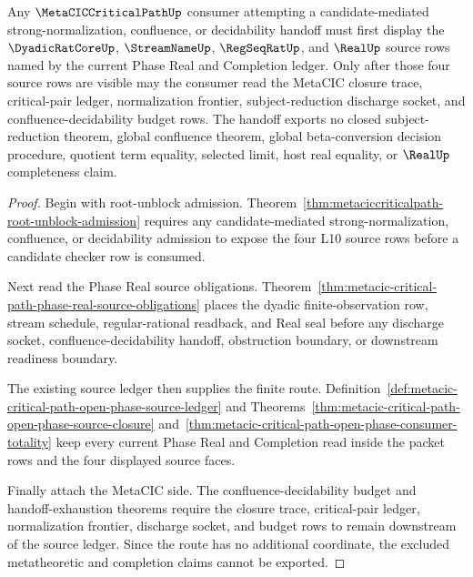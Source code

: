 \begin{theorem}
\label{thm:metacic-critical-path-confluence-decidability-source-budget}
Any $\MetaCICCriticalPathUp$ consumer attempting a candidate-mediated strong-normalization, confluence, or decidability handoff must first display the $\DyadicRatCoreUp$, $\StreamNameUp$, $\RegSeqRatUp$, and $\RealUp$ source rows named by the current Phase Real and Completion ledger. Only after those four source rows are visible may the consumer read the MetaCIC closure trace, critical-pair ledger, normalization frontier, subject-reduction discharge socket, and confluence-decidability budget rows. The handoff exports no closed subject-reduction theorem, global confluence theorem, global beta-conversion decision procedure, quotient term equality, selected limit, host real equality, or $\RealUp$ completeness claim.
\end{theorem}
\begin{proof}
Begin with root-unblock admission. Theorem~\ref{thm:metaciccriticalpath-root-unblock-admission} requires any candidate-mediated strong-normalization, confluence, or decidability admission to expose the four L10 source rows before a candidate checker row is consumed.

Next read the Phase Real source obligations. Theorem~\ref{thm:metacic-critical-path-phase-real-source-obligations} places the dyadic finite-observation row, stream schedule, regular-rational readback, and Real seal before any discharge socket, confluence-decidability handoff, obstruction boundary, or downstream readiness boundary.

The existing source ledger then supplies the finite route. Definition~\ref{def:metacic-critical-path-open-phase-source-ledger} and Theorems~\ref{thm:metacic-critical-path-open-phase-source-closure} and~\ref{thm:metacic-critical-path-open-phase-consumer-totality} keep every current Phase Real and Completion read inside the packet rows and the four displayed source faces.

Finally attach the MetaCIC side. The confluence-decidability budget and handoff-exhaustion theorems require the closure trace, critical-pair ledger, normalization frontier, discharge socket, and budget rows to remain downstream of the source ledger. Since the route has no additional coordinate, the excluded metatheoretic and completion claims cannot be exported.
\end{proof}

